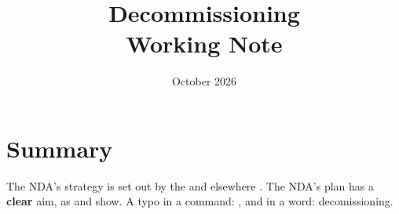 \documentclass[a4paper,12pt]{article}
\title{Decommissioning\\[0.4em]\large Working Note}
\date{\nth{11} October 2026}
\begin{document}
\maketitle
\thispagestyle{fancy}
\acresetall
\section{Summary}
The \ac{NDA}'s strategy is set out by the \dept{} \autocite[pp.~17--18]{strategy}
and elsewhere \autocites[Appendix~2]{onrtags}{govresponse}. The NDA's plan
has a \textbf{clear} aim, as \Textcite{strategy} and \parencite{strategy} show.
A typo in a command: \acrsetall, and in a word: decomissioning.
\printbibliography[title={References}]
\printacronyms
\end{document}
